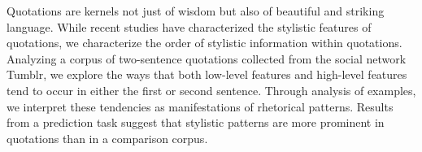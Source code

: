 Quotations are kernels not just of wisdom but also of beautiful and striking language. While recent studies have characterized the stylistic features of quotations, we characterize the order of stylistic information within quotations. Analyzing a corpus of two-sentence quotations collected from the social network Tumblr, we explore the ways that both low-level features and high-level features tend to occur in either the first or second sentence. Through analysis of examples, we interpret these tendencies as manifestations of rhetorical patterns. Results from a prediction task suggest that stylistic patterns are more prominent in quotations than in a comparison corpus.
